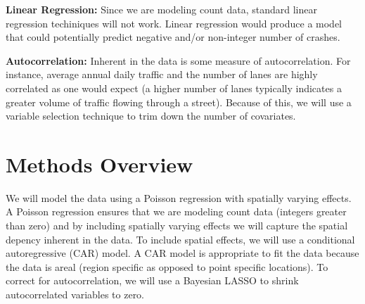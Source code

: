
\noindent
\textbf{Linear Regression:} Since we are modeling count data, standard linear regression techiniques will not work. Linear regression would produce a model that could potentially predict negative and/or non-integer number of crashes. 

\noindent
\textbf{Autocorrelation:} Inherent in the data is some measure of autocorrelation. For instance, average annual daily traffic and the number of lanes are highly correlated as one would expect (a higher number of lanes typically indicates a greater volume of traffic flowing through a street).  Because of this, we will use a variable selection technique to trim down the number of covariates.

\section{Methods Overview}

We will model the data using a Poisson regression with spatially varying effects. A Poisson regression ensures that we are modeling count data (integers greater than zero) and by including spatially varying effects we will capture the spatial depency inherent in the data. To include spatial effects, we will use a conditional autoregressive (CAR) model. A CAR model is appropriate to fit the data because the data is areal (region specific as opposed to point specific locations). To correct for autocorrelation, we will use a Bayesian LASSO to shrink autocorrelated variables to zero. 
